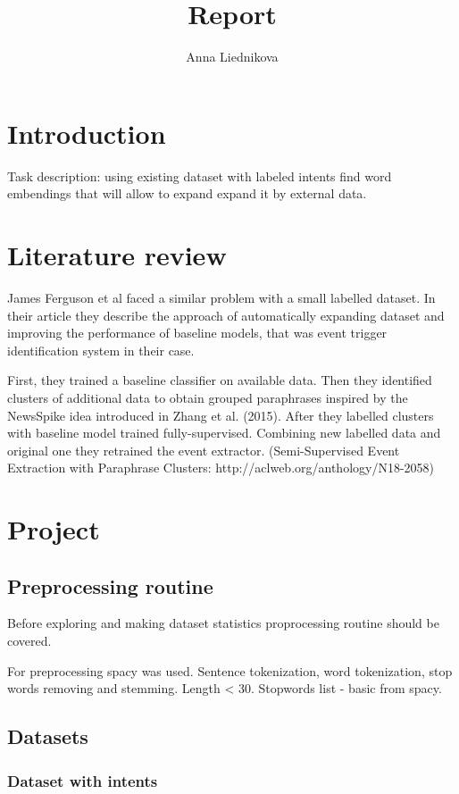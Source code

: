 \documentclass[11pt]{article}
\title{Report}
\author{Anna Liednikova}
\begin{document}
\section{Introduction}

Task description: using existing dataset with labeled intents find word embendings that will allow to expand expand it by external data.

\section{Literature review}

James Ferguson et al faced a similar problem with a small labelled dataset. In their article they describe the approach of automatically expanding dataset and improving the performance of baseline models, that was event trigger identification system in their case.

First, they trained a baseline classifier on available data. Then they identified clusters of additional data to obtain grouped paraphrases inspired by the NewsSpike idea introduced in Zhang et al. (2015). After they labelled clusters with baseline model trained fully-supervised. Combining new labelled data and original one they retrained the event extractor. (Semi-Supervised Event Extraction with Paraphrase Clusters: http://aclweb.org/anthology/N18-2058)



\section{Project}

\subsection{Preprocessing routine}

Before exploring and making dataset statistics proprocessing routine should be covered.

For preprocessing spacy was used. Sentence tokenization, word tokenization, stop words removing and stemming. Length < 30. Stopwords list - basic from spacy.

\subsection{Datasets}

\subsubsection{Dataset with intents}
\end{document}

